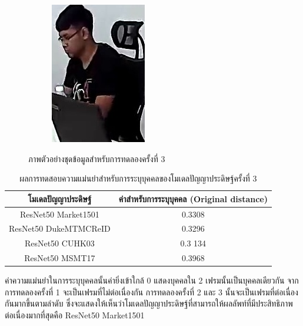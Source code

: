 \begin{figure}[!ht]
\begin{subfigure}[b]{0.2\textwidth}
        \includegraphics[width=\textwidth]{chapter4/images/fei_1.jpg}
        \label{fig:ex_6}
    \end{subfigure}
    \caption{ภาพตัวอย่างชุดข้อมูลสำหรับการทดลองครั้งที่ 3}
    \label{fig: ภาพตัวอย่างชุดข้อมูลสำหรับการทดลอง 3}
\end{figure}
\begin{table}[!ht]
    \centering
    \begin{tabular}{|c|c|}
		\hline
		{โมเดลปัญญาประดิษฐ์}&{ค่าสำหรับการระบุบุคคล (Original distance)}							\\
		\hline
		ResNet50 Market1501	 			& 0.3308								\\
		ResNet50 DukeMTMCReID			& 0.3296								\\
		ResNet50 CUHK03				& 0.3	134								\\
		ResNet50 MSMT17				& 0.3968								\\
	\hline
    \end{tabular}
    \caption{ผลการทดสอบความแม่นยำสำหรับการระบุบุคคลของโมเดลปัญญาประดิษฐ์ครั้งที่ 3}
    \label{tab: Original distant of image 3}
\end{table}
ค่าความแม่นยำในการระบุบุคคลนั้นค่ายิ่งเข้าใกล้ 0 แสดงบุคคลใน 2 เฟรมนั้นเป็นบุคคลเดียวกัน จากการทดลองครั้งที่ 1 จะเป็นเฟรมที่ไม่ต่อเนื่องกัน การทดลองครั้งที่ 2 และ 3 นั้นจะเป็นเฟรมที่ต่อเนื่องกันมากขึ้นตามลำดับ ซึ่งจะแสดงให้เห็นว่าโมเดลปัญญาประดิษฐ์ที่สามารถให้ผลลัพท์ที่มีประสิทธิภาพต่อเนื่องมากที่สุดคือ ResNet50 Market1501
